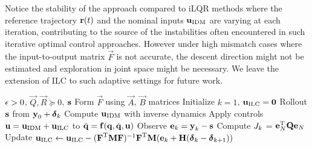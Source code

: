 
Notice the stability of the approach compared to iLQR methods where the reference trajectory $\boldsymbol{\mathrm{r}}(t)$ and the nominal inputs $\boldsymbol{\mathrm{u}}_{\mathrm{IDM}}$ are varying at each iteration, contributing to the source of the instabilities often encountered in such iterative optimal control approaches. However under high mismatch cases where the input-to-output matrix $\vec{F}$ is not accurate, the descent direction might not be estimated and exploration in joint space might be necessary. We leave the extension of ILC to such adaptive settings for future work.

\begin{algorithm}[tb]
   \caption{\alg}
   \label{alg1}
\begin{algorithmic}
    $\epsilon > 0$, $\vec{Q}, \vec{R} \succeq 0$, $\boldsymbol{\mathrm{s}}$ 
   \STATE Form $\vec{F}$ using $\vec{A}$, $\vec{B}$ matrices
   \STATE Initialize $k = 1$, $\boldsymbol{\mathrm{u}}_{\mathrm{ILC}} = \boldsymbol{\mathrm{0}}$
   \REPEAT 
   	   \STATE Rollout $\boldsymbol{\mathrm{s}}$ from $\boldsymbol{\mathrm{y}}_0 + \boldsymbol{\mathrm{\delta}}_k$ 
   	   \STATE Compute $\boldsymbol{\mathrm{u}}_{\mathrm{IDM}}$ with inverse dynamics
 	   \STATE Apply controls $\boldsymbol{\mathrm{u}} = \boldsymbol{\mathrm{u}}_{\mathrm{IDM}} + \boldsymbol{\mathrm{u}}_{\mathrm{ILC}}$ to $\ddot{\boldsymbol{\mathrm{q}}} = \boldsymbol{\mathrm{f}}(\boldsymbol{\mathrm{q}},\dot{\boldsymbol{\mathrm{q}}},\boldsymbol{\mathrm{u}})$ %
 	   \STATE Observe $\boldsymbol{\mathrm{e}}_k = \boldsymbol{\mathrm{y}}_k - \boldsymbol{\mathrm{s}}$
 	   \STATE Compute $J_k$ = $\boldsymbol{\mathrm{e}}_N^{\mathrm{T}}\boldsymbol{\mathrm{Q}}\boldsymbol{\mathrm{e}}_N$
 	   \STATE Update $\boldsymbol{\mathrm{u}}_{\mathrm{ILC}} \leftarrow \boldsymbol{\mathrm{u}}_{\mathrm{ILC}} - (\boldsymbol{\mathrm{F}}^{\mathrm{T}}\boldsymbol{\mathrm{M}}\boldsymbol{\mathrm{F}})^{-1}\boldsymbol{\mathrm{F}}^{\mathrm{T}}\boldsymbol{\mathrm{M}}(\boldsymbol{\mathrm{e}}_k + \boldsymbol{\mathrm{H}}(\boldsymbol{\mathrm{\delta}}_k - \boldsymbol{\mathrm{\delta}}_{k+1}))$
\end{algorithmic}
\end{algorithm}